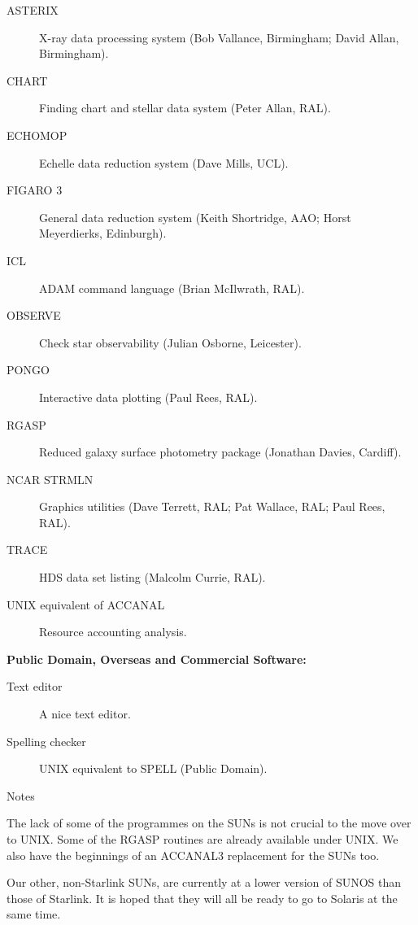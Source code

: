 \begin{description}
\item[ASTERIX] X-ray data processing system (Bob Vallance, Birmingham;
David Allan, Birmingham).
\item[CHART] Finding chart and stellar data system (Peter Allan, RAL).
\item[ECHOMOP] Echelle data reduction system (Dave Mills, UCL).
\item[FIGARO 3] General data reduction system (Keith Shortridge, AAO; Horst
Meyerdierks, Edinburgh).
\item[ICL] ADAM command language (Brian McIlwrath, RAL).
\item[OBSERVE] Check star observability (Julian Osborne, Leicester).
\item[PONGO] Interactive data plotting (Paul Rees, RAL).
\item[RGASP] Reduced galaxy surface photometry package (Jonathan Davies,
Cardiff).
\item[NCAR STRMLN] Graphics utilities (Dave Terrett, RAL; Pat Wallace, RAL;
Paul Rees, RAL).
\item[TRACE] HDS data set listing (Malcolm Currie, RAL).
\item[UNIX equivalent of ACCANAL] Resource accounting analysis.
\end{description}


\vspace{5mm}
\begin{center}
{\bf Public Domain, Overseas and Commercial Software:}
\end{center}

\begin{description}
\item[Text editor] A nice text editor.
\item[Spelling checker] UNIX equivalent to SPELL (Public Domain).
\end{description}


\vspace{5mm}
\begin{center}
{\large\sc Notes}
\end{center}

The lack of some of the programmes on the SUNs is not crucial to the move
over to UNIX.
Some of the RGASP routines are already available under UNIX.
We also have the beginnings of an ACCANAL3 replacement for the SUNs too.

Our other, non-Starlink SUNs, are currently at a lower version of SUNOS than
those of Starlink.
It is hoped that they will all be ready to go to Solaris at the same time.


